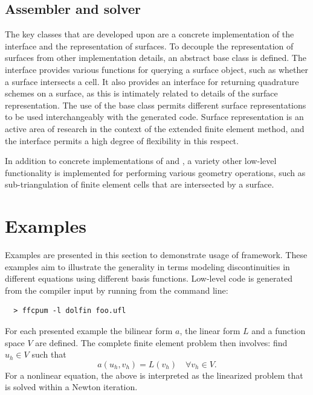 \subsection{Assembler and solver}

The key classes that are developed upon \dolfin{} are a concrete
implementation of the  interface and the representation
of surfaces. To decouple the representation of surfaces from other
implementation details, an abstract base class  is
defined. The  interface provides various functions
for querying a surface object, such as whether a surface intersects
a cell.  It also provides an interface for returning quadrature
schemes on a surface, as this is intimately related to details of the
surface representation.  The use of the base class 
permits different surface representations to be used interchangeably
with the generated code. Surface representation is an active area of
research in the context of the extended finite element method, and the
 interface permits a high degree of flexibility in
this respect.

In addition to concrete implementations of  and
, a variety other low-level functionality is
implemented for performing various geometry operations, such as
sub-triangulation of finite element cells that are intersected by
a surface.

\section{Examples}
\label{nikbakht:sec:examples}
%
Examples are presented in this section to demonstrate usage
of framework.  These examples aim to illustrate the generality
in terms modeling discontinuities in different equations using different
basis functions. Low-level code is generated from the compiler input by
running from the command line:
{\small
\begin{verbatim}
  > ffcpum -l dolfin foo.ufl
\end{verbatim}
}

For each presented example the bilinear form $a$, the linear form $L$
and a function space $V$ are defined. The complete finite element problem
then involves: find $u_{h} \in V$ such that
%
\begin{equation}
  a(u_{h}, v_{h}) = L(v_{h}) \quad \forall v_{h} \in V.
\end{equation}
%
For a nonlinear equation, the above is interpreted as the linearized problem
that is solved within a Newton iteration.

